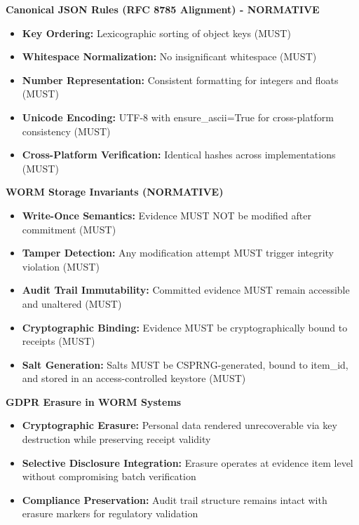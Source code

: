 \documentclass[12pt,a4paper]{article}
\begin{document}
\begin{technicalbox}
\textbf{Canonical JSON Rules (RFC 8785 Alignment) - NORMATIVE}
\begin{itemize}
\item \textbf{Key Ordering:} Lexicographic sorting of object keys (MUST)
\item \textbf{Whitespace Normalization:} No insignificant whitespace (MUST)
\item \textbf{Number Representation:} Consistent formatting for integers and floats (MUST)
\item \textbf{Unicode Encoding:} UTF-8 with ensure\_ascii=True for cross-platform consistency (MUST)
\item \textbf{Cross-Platform Verification:} Identical hashes across implementations (MUST)
\end{itemize}

\textbf{WORM Storage Invariants (NORMATIVE)}
\begin{itemize}
\item \textbf{Write-Once Semantics:} Evidence MUST NOT be modified after commitment (MUST)
\item \textbf{Tamper Detection:} Any modification attempt MUST trigger integrity violation (MUST)
\item \textbf{Audit Trail Immutability:} Committed evidence MUST remain accessible and unaltered (MUST)
\item \textbf{Cryptographic Binding:} Evidence MUST be cryptographically bound to receipts (MUST)
\item \textbf{Salt Generation:} Salts MUST be CSPRNG-generated, bound to item\_id, and stored in an access-controlled keystore (MUST)
\end{itemize}

\textbf{GDPR Erasure in WORM Systems}
\begin{itemize}
\item \textbf{Cryptographic Erasure:} Personal data rendered unrecoverable via key destruction while preserving receipt validity
\item \textbf{Selective Disclosure Integration:} Erasure operates at evidence item level without compromising batch verification
\item \textbf{Compliance Preservation:} Audit trail structure remains intact with erasure markers for regulatory validation
\end{itemize}
\end{technicalbox}
\end{document}
